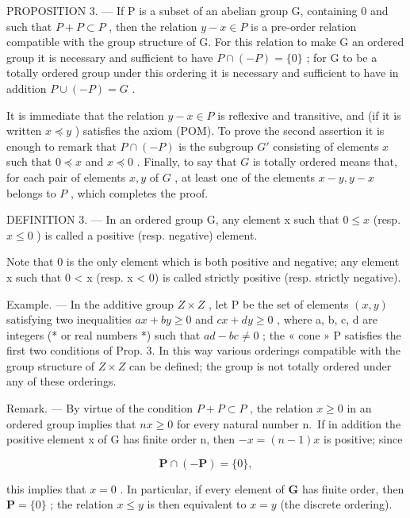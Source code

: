 PROPOSITION 3. --- If P is a subset of an abelian group G, containing 0 and such that \(P + P \subset P\) , then the relation \(y - x \in P\) is a pre-order relation compatible with the group structure of G. For this relation to make G an ordered group it is necessary and sufficient to have \(P \cap (-P) = \{0\}\) ; for G to be a totally ordered group under this ordering it is necessary and sufficient to have in addition \(P \cup (-P) = G\) .

It is immediate that the relation \(y - x \in P\) is reflexive and transitive, and (if it is written \(x \preccurlyeq y\) ) satisfies the axiom (POM). To prove the second assertion it is enough to remark that \(P \cap (-P)\) is the subgroup \(G'\) consisting of elements \(x\) such that \(0 \preccurlyeq x\) and \(x \preccurlyeq 0\) . Finally, to say that \(G\) is totally ordered means that, for each pair of elements \(x, y\) of \(G\) , at least one of the elements \(x - y, y - x\) belongs to \(P\) , which completes the proof.

DEFINITION 3. --- In an ordered group G, any element x such that \(0 \leqslant x\) (resp. \(x \leqslant 0\) ) is called a positive (resp. negative) element.

Note that 0 is the only element which is both positive and negative; any element x such that 0 \textless{} x (resp. x \textless{} 0) is called strictly positive (resp. strictly negative).

Example. --- In the additive group \(Z \times Z\) , let P be the set of elements \((x, y)\) satisfying two inequalities \(ax + by \geqslant 0\) and \(cx + dy \geqslant 0\) , where a, b, c, d are integers (* or real numbers *) such that \(ad - bc \neq 0\) ; the « cone » P satisfies the first two conditions of Prop. 3. In this way various orderings compatible with the group structure of \(Z \times Z\) can be defined; the group is not totally ordered under any of these orderings.

Remark. --- By virtue of the condition \(P + P \subset P\) , the relation \(x \geqslant 0\) in an ordered group implies that \(nx \geqslant 0\) for every natural number n.~If in addition the positive element x of G has finite order n, then \(-x = (n - 1)x\) is positive; since

\[
\mathbf {P} \cap (- \mathbf {P}) = \{0 \},
\]

this implies that \(x = 0\) . In particular, if every element of \(\mathbf{G}\) has finite order, then \(\mathbf{P} = \{0\}\) ; the relation \(x \leqslant y\) is then equivalent to \(x = y\) (the discrete ordering).

